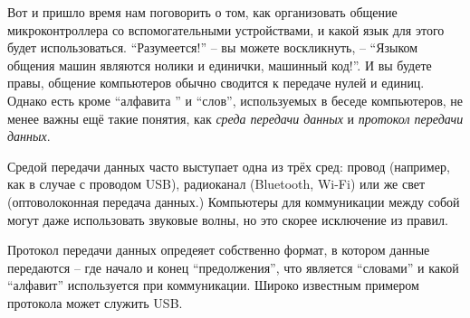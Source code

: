 \documentclass[../sparc.tex]{subfiles}
\begin{document}
Вот и пришло время нам поговорить о том, как организовать общение
микроконтроллера со вспомогательными устройствами, и какой язык для этого будет
использоваться.  ``Разумеется!'' -- вы можете воскликнуть, -- ``Языком общения
машин являются нолики и единички, машинный код!''.  И вы будете правы, общение
компьютеров обычно сводится к передаче нулей и единиц.  Однако есть кроме
``алфавита
'' и ``слов'', используемых в беседе компьютеров, не менее важны ещё
такие понятия, как \emph{среда передачи данных} и \emph{протокол передачи
данных}.

Средой передачи данных часто выступает одна из трёх сред: провод (например, как
в случае с проводом USB), радиоканал (Bluetooth, Wi-Fi) или же свет
(оптоволоконная передача данных.)  Компьютеры для коммуникации между собой могут
даже использовать звуковые волны, но это скорее исключение из правил.

Протокол передачи данных опредеяет собственно формат, в котором данные
передаются -- где начало и конец ``предолжения'', что является ``словами'' и
какой ``алфавит'' используется при коммуникации.  Широко известным примером
протокола может служить USB.
\end{document}
